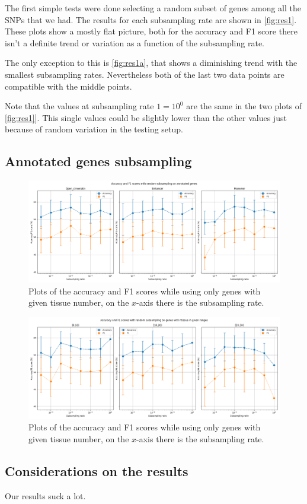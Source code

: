 The first simple tests were done selecting a random subset of genes among all the SNPs that we had. The results for each subsampling rate are shown in \autoref{fig:res1}.
These plots show a mostly flat picture, both for the accuracy and F1 score there isn't a definite trend or variation as a function of the subsampling rate.

The only exception to this is \autoref{fig:res1a}, that shows a diminishing trend with the smallest subsampling rates. Nevertheless both of the last two data points are compatible with the middle points.

Note that the values at subsampling rate $1 = 10^0$ are the same in the two plots of \autoref{fig:res1]}. This single values could be slightly lower than the other values just because of random variation in the testing setup.

\subsection{Annotated genes subsampling}
\begin{figure}[ht]
    \begin{center}
\includegraphics[width=\textwidth]{figures/subsample_annotated.png}
    \end{center}
\caption{Plots of the accuracy and F1 scores while using only genes with given tissue number, on the $x$-axis there is the subsampling rate.}
\label{fig:res3}
\end{figure}
\begin{figure}[ht]
    \begin{center}
\includegraphics[width=\textwidth]{figures/subsample_ntissue.png}
    \end{center}
\caption{Plots of the accuracy and F1 scores while using only genes with given tissue number, on the $x$-axis there is the subsampling rate.}
\label{fig:res4}
\end{figure}

\subsection{Considerations on the results}
Our results suck a lot.
